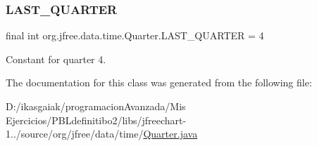 \subsubsection{\texorpdfstring{L\+A\+S\+T\+\_\+\+Q\+U\+A\+R\+T\+ER}{LAST\_QUARTER}}
{\footnotesize\ttfamily final int org.\+jfree.\+data.\+time.\+Quarter.\+L\+A\+S\+T\+\_\+\+Q\+U\+A\+R\+T\+ER = 4\hspace{0.3cm}{\ttfamily [static]}}

Constant for quarter 4. 

The documentation for this class was generated from the following file\+:\begin{DoxyCompactItemize}
\item 
D\+:/ikasgaiak/programacion\+Avanzada/\+Mis Ejercicios/\+P\+B\+Ldefinitibo2/libs/jfreechart-\/1../source/org/jfree/data/time/\mbox{\hyperlink{_quarter_8java}{Quarter.\+java}}\end{DoxyCompactItemize}
